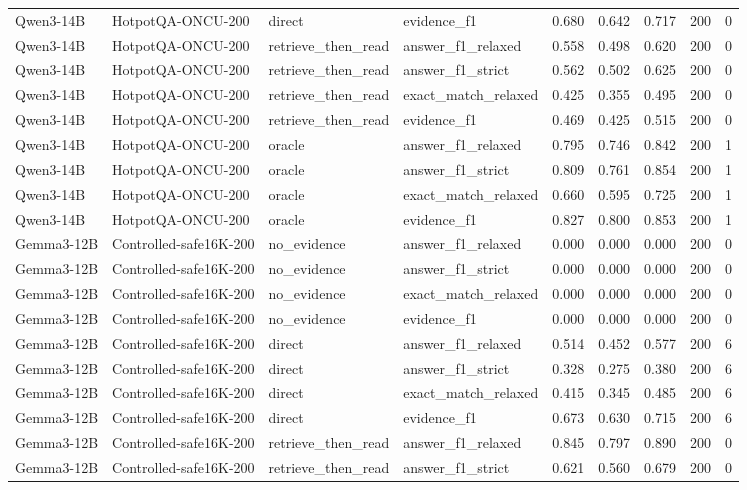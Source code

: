 \begin{tabular}{llllrrrrr}
Qwen3-14B & HotpotQA-ONCU-200 & direct & evidence_f1 & 0.680 & 0.642 & 0.717 & 200 & 0 \\
Qwen3-14B & HotpotQA-ONCU-200 & retrieve_then_read & answer_f1_relaxed & 0.558 & 0.498 & 0.620 & 200 & 0 \\
Qwen3-14B & HotpotQA-ONCU-200 & retrieve_then_read & answer_f1_strict & 0.562 & 0.502 & 0.625 & 200 & 0 \\
Qwen3-14B & HotpotQA-ONCU-200 & retrieve_then_read & exact_match_relaxed & 0.425 & 0.355 & 0.495 & 200 & 0 \\
Qwen3-14B & HotpotQA-ONCU-200 & retrieve_then_read & evidence_f1 & 0.469 & 0.425 & 0.515 & 200 & 0 \\
Qwen3-14B & HotpotQA-ONCU-200 & oracle & answer_f1_relaxed & 0.795 & 0.746 & 0.842 & 200 & 1 \\
Qwen3-14B & HotpotQA-ONCU-200 & oracle & answer_f1_strict & 0.809 & 0.761 & 0.854 & 200 & 1 \\
Qwen3-14B & HotpotQA-ONCU-200 & oracle & exact_match_relaxed & 0.660 & 0.595 & 0.725 & 200 & 1 \\
Qwen3-14B & HotpotQA-ONCU-200 & oracle & evidence_f1 & 0.827 & 0.800 & 0.853 & 200 & 1 \\
Gemma3-12B & Controlled-safe16K-200 & no_evidence & answer_f1_relaxed & 0.000 & 0.000 & 0.000 & 200 & 0 \\
Gemma3-12B & Controlled-safe16K-200 & no_evidence & answer_f1_strict & 0.000 & 0.000 & 0.000 & 200 & 0 \\
Gemma3-12B & Controlled-safe16K-200 & no_evidence & exact_match_relaxed & 0.000 & 0.000 & 0.000 & 200 & 0 \\
Gemma3-12B & Controlled-safe16K-200 & no_evidence & evidence_f1 & 0.000 & 0.000 & 0.000 & 200 & 0 \\
Gemma3-12B & Controlled-safe16K-200 & direct & answer_f1_relaxed & 0.514 & 0.452 & 0.577 & 200 & 6 \\
Gemma3-12B & Controlled-safe16K-200 & direct & answer_f1_strict & 0.328 & 0.275 & 0.380 & 200 & 6 \\
Gemma3-12B & Controlled-safe16K-200 & direct & exact_match_relaxed & 0.415 & 0.345 & 0.485 & 200 & 6 \\
Gemma3-12B & Controlled-safe16K-200 & direct & evidence_f1 & 0.673 & 0.630 & 0.715 & 200 & 6 \\
Gemma3-12B & Controlled-safe16K-200 & retrieve_then_read & answer_f1_relaxed & 0.845 & 0.797 & 0.890 & 200 & 0 \\
Gemma3-12B & Controlled-safe16K-200 & retrieve_then_read & answer_f1_strict & 0.621 & 0.560 & 0.679 & 200 & 0 \\

\end{tabular}
